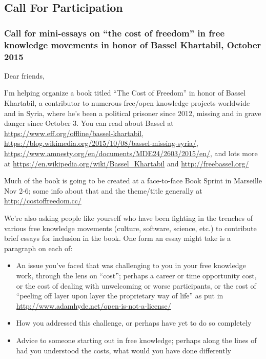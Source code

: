 \subsection{Call For Participation}\label{call-for-participation}

\subsubsection{\texorpdfstring{Call for mini-essays on ``the cost of
freedom'' in free knowledge movements in honor of Bassel Khartabil,
October
2015}{Call for mini-essays on the cost of freedom in free knowledge movements in honor of Bassel Khartabil, October 2015}}\label{call-for-mini-essays-on-the-cost-of-freedom-in-free-knowledge-movements-in-honor-of-bassel-khartabil-october-2015}

Dear friends,

I'm helping organize a book titled ``The Cost of Freedom'' in honor of
Bassel Khartabil, a contributor to numerous free/open knowledge projects
worldwide and in Syria, where he's been a political prisoner since 2012,
missing and in grave danger since October 3. You can read about Bassel
at \url{https://www.eff.org/offline/bassel-khartabil},
\url{https://blog.wikimedia.org/2015/10/08/bassel-missing-syria/},
\url{https://www.amnesty.org/en/documents/MDE24/2603/2015/en/}, and lots
more at \url{https://en.wikipedia.org/wiki/Bassel_Khartabil} and
\url{http://freebassel.org/}

Much of the book is going to be created at a face-to-face Book Sprint in
Marseille Nov 2-6; some info about that and the theme/title generally at
\url{http://costoffreedom.cc/}

We're also asking people like yourself who have been fighting in the
trenches of various free knowledge movements (culture, software,
science, etc.) to contribute brief essays for inclusion in the book. One
form an essay might take is a paragraph on each of:

\begin{itemize}
\tightlist
\item
  An issue you've faced that was challenging to you in your free
  knowledge work, through the lens on ``cost''; perhaps a career or time
  opportunity cost, or the cost of dealing with unwelcoming or worse
  participants, or the cost of ``peeling off layer upon layer the
  proprietary way of life'' as put in
  \url{http://www.adamhyde.net/open-is-not-a-license/}
\item
  How you addressed this challenge, or perhaps have yet to do so
  completely
\item
  Advice to someone starting out in free knowledge; perhaps along the
  lines of had you understood the costs, what would you have done
  differently
\end{itemize}

